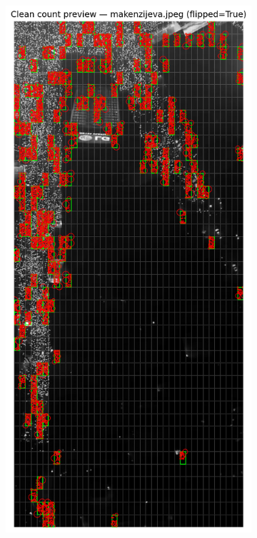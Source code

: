 \documentclass[a4paper,12pt]{article}
\begin{document}
\begin{figure}[H]
	\begin{subfigure}[b]{0.3\textwidth}
	  \centering
	  \includegraphics[width=\textwidth]{../outputs/sampling_outputs/previews_images_main/makenzijeva_pilot_clean_count_preview.png}

\end{subfigure}
\end{figure}
\end{document}
